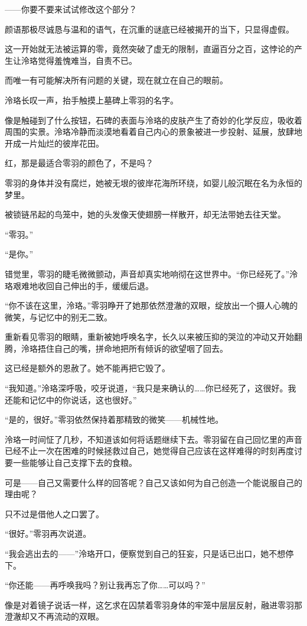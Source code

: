 \documentclass[UTF8, scheme = chinese, openany]{ctexbook}
\begin{document}
——你要不要来试试修改这个部分？

颜语那极尽诚恳与温和的语气，在沉重的谜底已经被揭开的当下，只显得虚假。

这一开始就无法被运算的零，竟然突破了虚无的限制，直逼百分之百，这悖论的产生让泠珞觉得羞愧难当，自责不已。

而唯一有可能解决所有问题的关键，现在就立在自己的眼前。

泠珞长叹一声，抬手触摸上墓碑上零羽的名字。

像是触碰到了什么按钮，石碑的表面与泠珞的皮肤产生了奇妙的化学反应，吸收着周围的实景。泠珞冷静而淡漠地看着自己内心的景象被进一步投射、延展，放肆地开成一片灿烂的彼岸花田。

红，那是最适合零羽的颜色了，不是吗？

零羽的身体并没有腐烂，她被无垠的彼岸花海所环绕，如婴儿般沉眠在名为永恒的梦里。

被锁链吊起的鸟笼中，她的头发像天使翅膀一样散开，却无法带她去往天堂。

“零羽。”

“是你。”

错觉里，零羽的睫毛微微颤动，声音却真实地响彻在这世界中。“你已经死了。”泠珞艰难地收回自己伸出的手，缓缓后退。

“你不该在这里，泠珞。”零羽睁开了她那依然澄澈的双眼，绽放出一个摄人心魄的微笑，与记忆中的别无二致。

重新看见零羽的眼睛，重新被她呼唤名字，长久以来被压抑的哭泣的冲动又开始翻腾，泠珞捂住自己的嘴，拼命地把所有倾诉的欲望咽了回去。

这已经是额外的恩赦了。她不能再把它毁了。

“我知道。”泠珞深呼吸，咬牙说道，“我只是来确认的……你已经死了，这很好。我还能和记忆中的你说话，这也很好。”

“是的，很好。”零羽依然保持着那精致的微笑——机械性地。

泠珞一时间怔了几秒，不知道该如何将话题继续下去。零羽留在自己回忆里的声音已经不止一次在困难的时候拯救过自己，她觉得自己应该在这样难得的时刻再度讨要一些能够让自己支撑下去的食粮。

可是——自己又需要什么样的回答呢？自己又该如何为自己创造一个能说服自己的理由呢？

只不过是借他人之口罢了。

“很好。”零羽再次说道。

“我会逃出去的——”泠珞开口，便察觉到自己的狂妄，只是话已出口，她不想停下。

“你还能——再呼唤我吗？别让我再忘了你……可以吗？”

像是对着镜子说话一样，这乞求在囚禁着零羽身体的牢笼中层层反射，融进零羽那澄澈却又不再流动的双眼。
\end{document}
